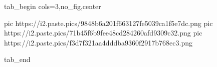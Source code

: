  
 
 
 
 


\ifcmt
  tab_begin cols=3,no_fig,center

     pic https://i2.paste.pics/9848b6a201f663127fe5039ca1f5e7dc.png
		 pic https://i2.paste.pics/71b45f6b9fee48cd284260afd9309c32.png
		 pic https://i2.paste.pics/f3d7f321aa4dddba9360f2917b768ec3.png

  tab_end
\fi
